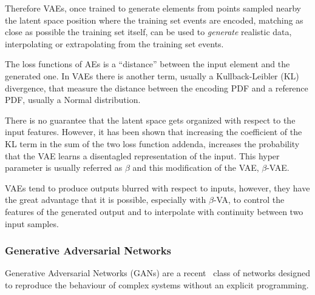 Therefore VAEs, once trained to generate elements from points sampled nearby the latent space position where the training set events are encoded, matching as close as possible the  training set itself, 
can be used to \emph{generate} realistic data, 
interpolating or extrapolating from the training set events.

The loss functions of AEs is a ``distance'' between the input element and the generated one. In VAEs there is another term, usually a Kullback-Leibler (KL) divergence, that measure the distance between the encoding PDF and a reference PDF, usually a Normal distribution.

There is no guarantee that the latent space gets organized with respect to the input features. However, it has been shown \cite{bvae} that increasing the coefficient of the KL term in the sum of the two loss function addenda, increases the probability that the VAE learns a disentagled representation of the input. This hyper parameter is usually referred as $\beta$ and this modification of the VAE, $\beta$-VAE.

VAEs tend to produce outputs blurred with respect to inputs, however, they have the great advantage that it is possible, especially with $\beta$-VA, to control the features of the generated output and to interpolate with continuity between two input samples.

\subsubsection{Generative Adversarial Networks}
Generative Adversarial Networks (GANs) are a recent~\cite{goodfellow} class of networks designed to reproduce the behaviour of complex systems without an explicit programming.

